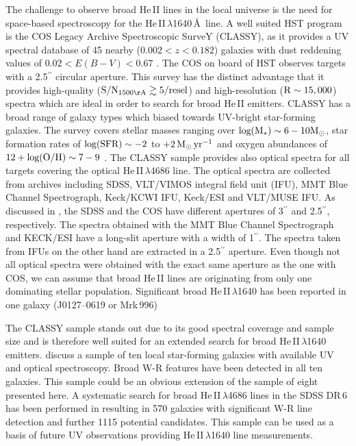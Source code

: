 \documentclass[linenumbers]{aastex63}
\begin{document}
The challenge to observe broad He\,II lines in the local universe is the need for space-based spectroscopy for the He\,II\,$\lambda$1640\,\AA\ line. 
A well suited HST program is the COS Legacy Archive Spectroscopic SurveY (CLASSY), as it provides a UV spectral database of 45 nearby ($0.002 < z < 0.182$) galaxies with dust reddening values of $0.02 < E(B-V) < 0.67$ \citep{berg_cos_2022}. The COS on board of HST observes targets with a 2.5$^{\prime\prime}$ circular aperture. 
This survey has the distinct advantage that it provides high-quality (${\rm S/N_{\rm 1500\AA} \gtrsim 5/resel}$) and high-resolution (${\rm R\sim15,000}$) \citep{james_classy_2022} spectra which are ideal in order to search for broad He\,II emitters. 
CLASSY has a broad range of galaxy types which biased towards UV-bright star-forming galaxies. The survey covers stellar masses ranging over ${\rm log(M_*) \sim 6-10 M_{\odot}}$, star formation rates of ${\rm log(SFR) \sim-2}$ to ${\rm +2\,M_{\odot}\,yr^{-1}}$ and oxygen abundances of ${\rm 12+log(O/H) \sim 7-9}$ \citep{berg_cos_2022}.
The CLASSY sample provides also optical spectra for all targets covering the optical He\,II\,$\lambda$4686 line. The optical spectra are collected from archives including SDSS, VLT/VIMOS integral field unit (IFU), MMT Blue Channel Spectrograph, Keck/KCWI IFU, Keck/ESI and VLT/MUSE IFU. As discussed in \citet{arellano-cordova_classy_2022}, the SDSS and the COS have different apertures of 3$^{\prime\prime}$ and 2.5$^{\prime\prime}$, respectively. The spectra obtained with the MMT Blue Channel Spectrograph and KECK/ESI have a long-slit aperture with a width of 1$^{\prime\prime}$.
The spectra taken from IFUs on the other hand are extracted in a 2.5$^{\prime\prime}$ aperture.
Even though not all optical spectra were obtained with the exact same aperture as the one with COS, we can assume that broad He\,II lines are originating from only one dominating stellar population. Significant broad He\,II\,$\lambda$1640 has been reported in one galaxy (J0127--0619 or Mrk\,996)

The CLASSY sample stands out due to its good spectral coverage and sample size and is therefore well suited for an extended search for broad He\,II\,$\lambda$1640 emitters. \citet{senchyna_ultraviolet_2021} discuss a sample of ten local star-forming galaxies with available UV and optical spectroscopy. Broad W-R features have been detected in all ten galaxies. This sample could be an obvious extension of the sample of eight presented here.  
A systematic search for broad He\,II\,$\lambda$4686 lines in the SDSS DR\,6 has been performed in \citet{brinchmann_galaxies_2008} resulting in 570 galaxies with significant W-R line detection and further 1115 potential candidates. This sample can be used as a basis of future UV observations providing He\,II\,$\lambda$1640 line measurements.
\end{document}
